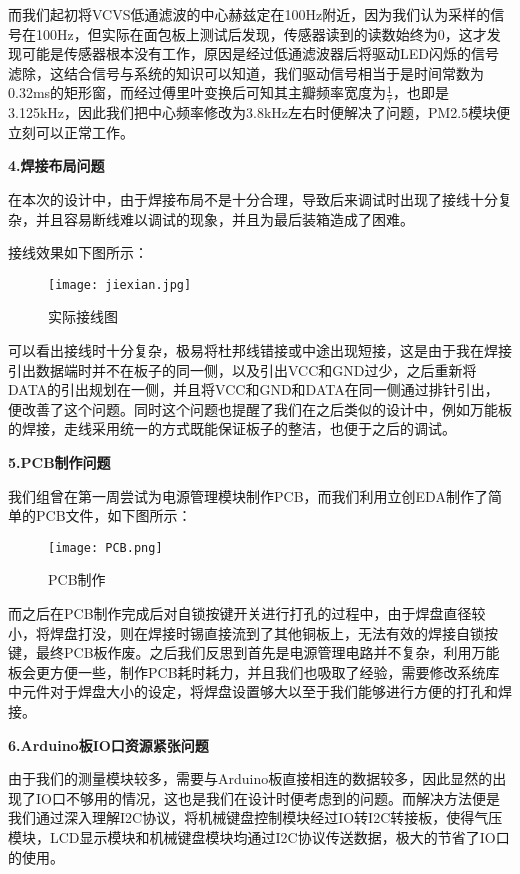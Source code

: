 \par{} 而我们起初将VCVS低通滤波的中心赫兹定在100Hz附近，因为我们认为采样的信号在100Hz，但实际在面包板上测试后发现，传感器读到的读数始终为0，这才发现可能是传感器根本没有工作，原因是经过低通滤波器后将驱动LED闪烁的信号滤除，这结合信号与系统的知识可以知道，我们驱动信号相当于是时间常数为0.32ms的矩形窗，而经过傅里叶变换后可知其主瓣频率宽度为$\frac{1}{\tau}$，也即是3.125kHz，因此我们把中心频率修改为3.8kHz左右时便解决了问题，PM2.5模块便立刻可以正常工作。

\par{} \textbf{4.焊接布局问题}
\par{} 在本次的设计中，由于焊接布局不是十分合理，导致后来调试时出现了接线十分复杂，并且容易断线难以调试的现象，并且为最后装箱造成了困难。
\par{} 接线效果如下图所示：
\begin{figure}[H]
  \centering
  \texttt{[image: jiexian.jpg]}
  \caption{实际接线图}
\end{figure}

\par{} 可以看出接线时十分复杂，极易将杜邦线错接或中途出现短接，这是由于我在焊接引出数据端时并不在板子的同一侧，以及引出VCC和GND过少，之后重新将DATA的引出规划在一侧，并且将VCC和GND和DATA在同一侧通过排针引出，便改善了这个问题。同时这个问题也提醒了我们在之后类似的设计中，例如万能板的焊接，走线采用统一的方式既能保证板子的整洁，也便于之后的调试。
\par{} \textbf{5.PCB制作问题}
\par{} 我们组曾在第一周尝试为电源管理模块制作PCB，而我们利用立创EDA制作了简单的PCB文件，如下图所示：
\begin{figure}[H]
  \centering
  \texttt{[image: PCB.png]}
  \caption{PCB制作}
\end{figure}
\par{} 而之后在PCB制作完成后对自锁按键开关进行打孔的过程中，由于焊盘直径较小，将焊盘打没，则在焊接时锡直接流到了其他铜板上，无法有效的焊接自锁按键，最终PCB板作废。之后我们反思到首先是电源管理电路并不复杂，利用万能板会更方便一些，制作PCB耗时耗力，并且我们也吸取了经验，需要修改系统库中元件对于焊盘大小的设定，将焊盘设置够大以至于我们能够进行方便的打孔和焊接。

\par{} \textbf{6.Arduino板IO口资源紧张问题}
\par{} 由于我们的测量模块较多，需要与Arduino板直接相连的数据较多，因此显然的出现了IO口不够用的情况，这也是我们在设计时便考虑到的问题。而解决方法便是我们通过深入理解I2C协议，将机械键盘控制模块经过IO转I2C转接板，使得气压模块，LCD显示模块和机械键盘模块均通过I2C协议传送数据，极大的节省了IO口的使用。
